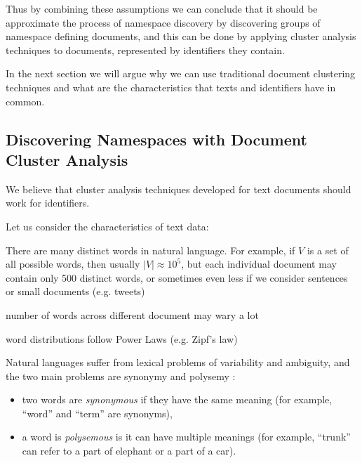 

Thus by combining these assumptions we can conclude that it should
be approximate the process of namespace discovery by discovering
groups of namespace defining documents, and this can be done by
applying cluster analysis techniques to documents, represented
by identifiers they contain.

In the next section we will argue why we can use traditional
document clustering techniques and what are the characteristics
that texts and identifiers have in common.


\subsection{Discovering Namespaces with Document Cluster Analysis} \label{sec:clusters-namespaces}


We believe that cluster analysis techniques developed for
text documents should work for identifiers.

Let us consider the characteristics of text data:

There are many distinct words in natural language. For example,
if $V$ is a set of all possible words, then usually $|V| \approx 10^5$,
but each individual document may contain only 500 distinct words, or
sometimes even less if we consider sentences or small documents
(e.g. tweets)

number of words across different document may wary a lot

 word distributions follow Power Laws (e.g. Zipf's law)




Natural languages suffer from lexical problems of variability and ambiguity,
and the two main problems are synonymy and polysemy \cite{deerwester1990indexing}
\cite{gliozzo2009semantic}:

\begin{itemize}
\itemsep1pt\parskip0pt
  \item two words are \emph{synonymous} if they have the same meaning
        (for example, ``word'' and ``term'' are synonyms),
  \item a word is \emph{polysemous} is it can have multiple meanings
        (for example, ``trunk'' can refer to a part of elephant or a part of a car).
\end{itemize}


